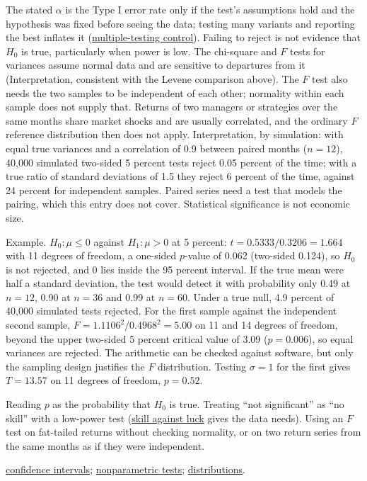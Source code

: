 \begin{qfmethod}
 The stated $\alpha$ is the Type I error rate only if the test's assumptions hold and the hypothesis was fixed before seeing the data; testing many variants and reporting the best inflates it (\hyperref[meth:multiple-testing-control]{multiple-testing control}). Failing to reject is not evidence that $H_0$ is true, particularly when power is low. The chi-square and $F$ tests for variances assume normal data and are sensitive to departures from it (Interpretation, consistent with the Levene comparison above). The $F$ test also needs the two samples to be independent of each other; normality within each sample does not supply that. Returns of two managers or strategies over the same months share market shocks and are usually correlated, and the ordinary $F$ reference distribution then does not apply. Interpretation, by simulation: with equal true variances and a correlation of 0.9 between paired months ($n=12$), 40{,}000 simulated two-sided 5 percent tests reject 0.05 percent of the time; with a true ratio of standard deviations of 1.5 they reject 6 percent of the time, against 24 percent for independent samples. Paired series need a test that models the pairing, which this entry does not cover. Statistical significance is not economic size.

 Example. $H_0:\mu\le0$ against $H_1:\mu>0$ at 5 percent: $t=0.5333/0.3206=1.664$ with 11 degrees of freedom, a one-sided $p$-value of 0.062 (two-sided 0.124), so $H_0$ is not rejected, and 0 lies inside the 95 percent interval. If the true mean were half a standard deviation, the test would detect it with probability only 0.49 at $n=12$, 0.90 at $n=36$ and 0.99 at $n=60$. Under a true null, 4.9 percent of 40{,}000 simulated tests rejected. For the first sample against the independent second sample, $F=1.1106^2/0.4968^2=5.00$ on 11 and 14 degrees of freedom, beyond the upper two-sided 5 percent critical value of 3.09 ($p=0.006$), so equal variances are rejected. The arithmetic can be checked against software, but only the sampling design justifies the $F$ distribution. Testing $\sigma=1$ for the first gives $T=13.57$ on 11 degrees of freedom, $p=0.52$.

 Reading $p$ as the probability that $H_0$ is true. Treating ``not significant'' as ``no skill'' with a low-power test (\hyperref[meth:skill-luck-significance-tests]{skill against luck} gives the data needs). Using an $F$ test on fat-tailed returns without checking normality, or on two return series from the same months as if they were independent.

 \hyperref[meth:confidence-intervals]{confidence intervals}; \hyperref[meth:nonparametric-tests]{nonparametric tests}; \hyperref[def:financial-distributions]{distributions}.

\end{qfmethod}

